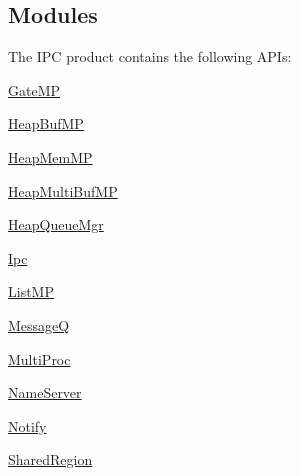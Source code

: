 \hypertarget{index_modules}{}\subsection{Modules}\label{index_modules}
The IPC product contains the following APIs:
\begin{DoxyItemize}
\item \hyperlink{_gate_m_p_8h}{GateMP}
\item \hyperlink{_heap_buf_m_p_8h}{HeapBufMP}
\item \hyperlink{_heap_mem_m_p_8h}{HeapMemMP}
\item \hyperlink{_heap_multi_buf_m_p_8h}{HeapMultiBufMP}
\item \hyperlink{_heap_queue_mgr_8h}{HeapQueueMgr}
\item \hyperlink{_ipc_8h}{Ipc}
\item \hyperlink{_list_m_p_8h}{ListMP}
\item \hyperlink{_message_q_8h}{MessageQ}
\item \hyperlink{_multi_proc_8h}{MultiProc}
\item \hyperlink{_name_server_8h}{NameServer}
\item \hyperlink{_notify_8h}{Notify}
\item \hyperlink{_shared_region_8h}{SharedRegion} 
\end{DoxyItemize}